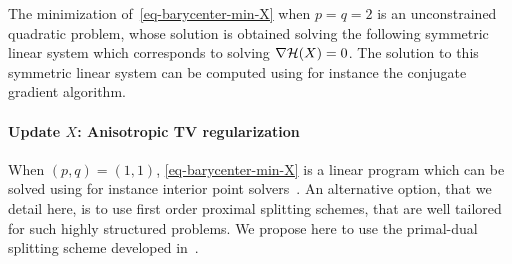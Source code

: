 The minimization of~\eqref{eq-barycenter-min-X} when $p=q=2$ is an unconstrained quadratic problem, whose solution is obtained solving the following symmetric linear system
which corresponds to solving $\nabla \mathcal{H}(X) =0$. The solution to this symmetric linear system can be computed using for instance the conjugate gradient algorithm.

\paragraph{Update $X$: Anisotropic TV regularization}

When $(p,q)=(1,1)$, \eqref{eq-barycenter-min-X} is a linear program which can be solved using for instance interior point solvers~\cite{Nesterov-Nemirovsky-Book}. An alternative option, that we detail here, is to use first order proximal splitting schemes, that are well tailored for such highly structured problems.  We propose here to use the primal-dual splitting scheme developed in~\cite{Chambolle11}.

